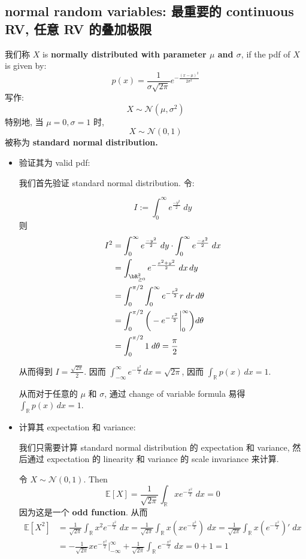 \subsection{normal random variables: 最重要的 continuous RV, 任意 RV 的叠加极限}
\begin{definition}
我们称 $X$ is \textbf{normally distributed with parameter $\mu$ and $\sigma$}, if the pdf of $X$ is given by: \[
p(x) = \frac{1}{\sigma \sqrt{2\pi}} e^{-\frac{(x - \mu)^2}{2 \sigma ^2}}
\]
写作: \[
X \sim \mathcal{N}(\mu, \sigma^2)
\]
特别地, 当 $\mu =0, \sigma = 1$ 时, \[
X \sim \mathcal{N}(0, 1)
\]被称为 \textbf{standard normal distribution.}
\end{definition}


\begin{itemize}
\item 验证其为 valid pdf: 

我们首先验证 standard normal distribution. 令:

\[
I := \int_ 0^\infty e^{\frac{-y^2}{2}} \; dy
\]
则
\begin{align*}
I^2 & = \int_ 0^\infty e^{\frac{-y^2}{2}} \; dy \cdot \int_ 0^\infty e^{\frac{-x^2}{2}} \; dx \\
& = \int_{\bR^2_{\geq 0}} e^{-\frac{x^2+y^2}{2}} \; dx \, dy \\
& = \int_0^{\pi/2} \int_0^\infty e^{-\frac{r^2}{2}} r \; dr \, d\theta \\
& = \int_0^{\pi/2} \bigg( -e^{-\frac{r^2}{2}} \bigg|_0^\infty \bigg) d\theta \\
& = \int_0^{\pi/2} 1 \; d\theta = \frac{\pi}{2}
\end{align*}

从而得到 \(I = \frac{\sqrt{2\pi}}{2}\). 因而
 \(\int_{-\infty}^{\infty} e^{-\frac{x^2}{2}} \, dx = \sqrt{2\pi}\), 
因而 \(\int_{\mathbb{R}} p(x) \, dx = 1 \). 

从而对于任意的 $\mu$ 和 $\sigma$, 通过 change of variable formula 
易得 \(\int_{\mathbb{R}} p(x) \, dx = 1 \).


\item 计算其 expectation 和 variance:

我们只需要计算 standard normal distribution 的 expectation 和 variance, 
然后通过 expectation 的 linearity 和 variance 的 scale invariance 来计算.

令 $ X \sim \mathcal{N}(0,1)$. Then \[
\mathbb{E}[X] =  \frac{1}{\sqrt{2\pi }} \int _{\mathbb{R}} x   e^{-\frac{x^2}{2}}    \; dx   = 0
\]
因为这是一个 \textbf{odd function}. 从而
\begin{align*}
    \mathbb{E}[X^2] &=  \frac{1}{\sqrt{2\pi }} \int _{\mathbb{R}} x^2   e^{-\frac{x^2}{2}}    \; dx  
    = \frac{1}{\sqrt{2\pi }} \int _{\mathbb{R}} x (x  e^{-\frac{x^2}{2}})    \; dx 
    = \frac{1}{\sqrt{2\pi }} \int _{\mathbb{R}} x   ( e^{-\frac{x^2}{2}} )'   \; dx  \\ 
    & = - \frac{1}{\sqrt{2\pi }}  x e^{-\frac{x^2}{2}} \bigg|^\infty_{-\infty}  +  \frac{1}{\sqrt{2\pi }} \int _{\mathbb{R}}  e^{-\frac{x^2}{2}}    \; dx 
    = 0 + 1 = 1
\end{align*}


\end{itemize}
